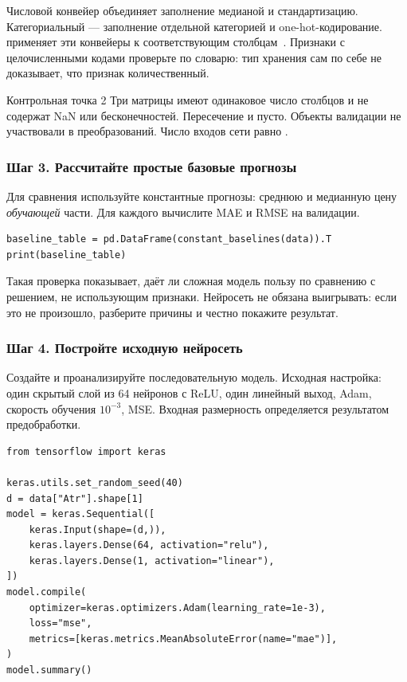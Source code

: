 Числовой конвейер объединяет заполнение медианой и стандартизацию.
Категориальный --- заполнение отдельной категорией и one-hot-кодирование.
 применяет эти конвейеры к соответствующим
столбцам~\cite{columntransformer}. Признаки с целочисленными кодами
проверьте по словарю: тип хранения сам по себе не доказывает,
что признак количественный.

\begin{keybox}{Контрольная точка 2}
Три матрицы имеют одинаковое число столбцов и не содержат NaN или
бесконечностей. Пересечение  и
 пусто. Объекты валидации не участвовали
в  преобразований. Число входов сети равно
.
\end{keybox}

\subsubsection*{Шаг 3. Рассчитайте простые базовые прогнозы}
Для сравнения используйте константные прогнозы: среднюю и медианную цену
\textit{обучающей} части. Для каждого вычислите MAE и RMSE на валидации.

\begin{lstlisting}
baseline_table = pd.DataFrame(constant_baselines(data)).T
print(baseline_table)
\end{lstlisting}

Такая проверка показывает, даёт ли сложная модель пользу по сравнению
с решением, не использующим признаки. Нейросеть не обязана выигрывать:
если это не произошло, разберите причины и честно покажите результат.

\subsubsection*{Шаг 4. Постройте исходную нейросеть}
Создайте и проанализируйте последовательную модель. Исходная настройка:
один скрытый слой из 64 нейронов с ReLU, один линейный выход, Adam,
скорость обучения \(10^{-3}\), MSE. Входная размерность определяется
результатом предобработки.

\begin{lstlisting}
from tensorflow import keras

keras.utils.set_random_seed(40)
d = data["Atr"].shape[1]
model = keras.Sequential([
    keras.Input(shape=(d,)),
    keras.layers.Dense(64, activation="relu"),
    keras.layers.Dense(1, activation="linear"),
])
model.compile(
    optimizer=keras.optimizers.Adam(learning_rate=1e-3),
    loss="mse",
    metrics=[keras.metrics.MeanAbsoluteError(name="mae")],
)
model.summary()
\end{lstlisting}

